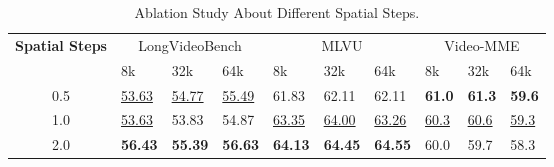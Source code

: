 \renewcommand{\arraystretch}{1.1}
\begin{table*}[!h]
\setlength\tabcolsep{12pt}
\centering
\caption {Ablation Study About Different Spatial Steps.
}\label{tab:ablation_spatial_steps}
\vspace{2mm}
\footnotesize
\begin{tabular}{clllllllll}
\hline
\multirow{2}{*}{\textbf{Spatial Steps}}  & \multicolumn{3}{c}{LongVideoBench} & \multicolumn{3}{c}{MLVU} & \multicolumn{3}{c}{Video-MME} \\ 
\cmidrule(lr){2-4} %
\cmidrule(lr){5-7} %
\cmidrule(lr){8-10} %
 & 8k & 32k & 64k & 8k & 32k & 64k & 8k & 32k & 64k \\ \hline
0.5 & \underline{53.63} & \underline{54.77} & \underline{55.49} & 61.83 & 62.11 & 62.11 & \textbf{61.0} & \textbf{61.3} & \textbf{59.6} \\
1.0 & \underline{53.63} & 53.83 & 54.87 & \underline{63.35} & \underline{64.00} & \underline{63.26} & \underline{60.3} & \underline{60.6} & \underline{59.3} \\
2.0 & \textbf{56.43} & \textbf{55.39} & \textbf{56.63} & \textbf{64.13} & \textbf{64.45} & \textbf{64.55} & 60.0 & 59.7 & 58.3 \\ \hline
\end{tabular}

\end{table*}